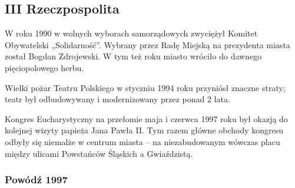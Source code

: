\documentclass{article}
\begin{document}
\subsection{III Rzeczpospolita}

W roku 1990 w wolnych wyborach samorządowych zwyciężył Komitet Obywatelski „Solidarność”. Wybrany przez Radę Miejską na prezydenta miasta został Bogdan Zdrojewski. W tym też roku miasto wróciło do dawnego pięciopolowego herbu.

Wielki pożar Teatru Polskiego w styczniu 1994 roku przyniósł znaczne straty; teatr był odbudowywany i modernizowany przez ponad 2 lata.

Kongres Eucharystyczny na przełomie maja i czerwca 1997 roku był okazją do kolejnej wizyty papieża Jana Pawła II. Tym razem główne obchody kongresu odbyły się niemalże w centrum miasta – na niezabudowanym wówczas placu między ulicami Powstańców Śląskich a Gwiaździstą.

\subsubsection{Powódź 1997}
\end{document}
